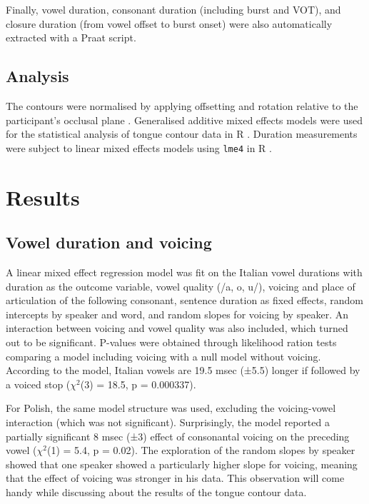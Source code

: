 \documentclass[]{elsarticle}
\begin{document}
Finally, vowel duration, consonant duration (including burst and VOT),
and closure duration (from vowel offset to burst onset) were also
automatically extracted with a Praat script.

\subsection{Analysis}\label{analysis}

The contours were normalised by applying offsetting and rotation
relative to the participant's occlusal plane \citep{scobbie2011}.
Generalised additive mixed effects models \citep{wood2006} were used for
the statistical analysis of tongue contour data in R
\citep{r-core-team2017}. Duration measurements were subject to linear
mixed effects models using \texttt{lme4} in R \citep{bates2015}.

\section{Results}\label{results}

\subsection{Vowel duration and
voicing}\label{vowel-duration-and-voicing}

A linear mixed effect regression model was fit on the Italian vowel
durations with duration as the outcome variable, vowel quality (/a, o,
u/), voicing and place of articulation of the following consonant,
sentence duration as fixed effects, random intercepts by speaker and
word, and random slopes for voicing by speaker. An interaction between
voicing and vowel quality was also included, which turned out to be
significant. P-values were obtained through likelihood ration tests
comparing a model including voicing with a null model without voicing.
According to the model, Italian vowels are 19.5 msec (±5.5) longer if
followed by a voiced stop (\(\chi^2\)(3) = 18.5, p = 0.000337).

For Polish, the same model structure was used, excluding the
voicing-vowel interaction (which was not significant). Surprisingly, the
model reported a partially significant 8 msec (±3) effect of consonantal
voicing on the preceding vowel (\(\chi^2\)(1) = 5.4, p = 0.02). The
exploration of the random slopes by speaker showed that one speaker
showed a particularly higher slope for voicing, meaning that the effect
of voicing was stronger in his data. This observation will come handy
while discussing about the results of the tongue contour data.
\end{document}
